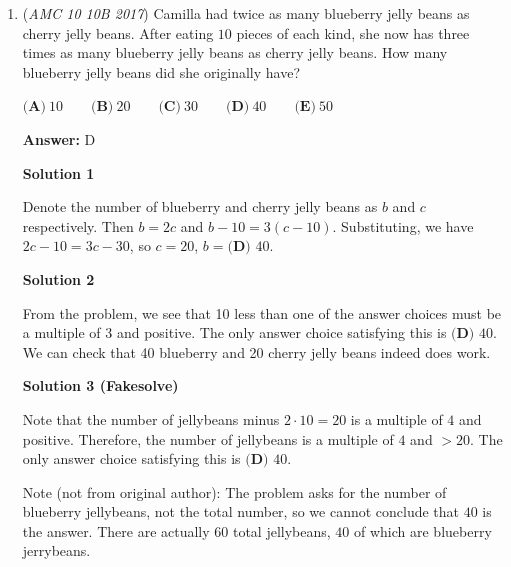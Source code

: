 \begin{enumerate}
\textbf{Solution 2}

Substituting each $x$ and $y$ with $1$, we see that the given equation holds true, as $\frac{3(1)+1}{1-3(1)} = -2$. Thus, $\frac{x+3y}{3x-y}=\boxed{\textbf{(D)}\ 2}$




\textbf{Solution 3}

Let $y=ax$. The first equation converts into $\frac{(3+a)x}{(1-3a)x}=-2$, which simplifies to $3+a=-2(1-3a)$. After a bit of algebra we found out $a=1$, which means that $x=y$. Substituting $y=x$ into the second equation it becomes $\frac{4x}{2x}=\boxed{\textbf{(D)}\ 2}$ - mathleticguyyy

 


	\item (\textit{AMC 10 10B 2017}) Camilla had twice as many blueberry jelly beans as cherry jelly beans. After eating $10$ pieces of each kind, she now has three times as many blueberry jelly beans as cherry jelly beans. How many blueberry jelly beans did she originally have?


 $\textbf{(A)}\ 10\qquad\textbf{(B)}\ 20\qquad\textbf{(C)}\ 30\qquad\textbf{(D)}\ 40\qquad\textbf{(E)}\ 50$

 \textbf{Answer: }D



\textbf{Solution 1}

Denote the number of blueberry and cherry jelly beans as $b$ and $c$ respectively. Then $b = 2c$ and $b-10 = 3(c-10)$. Substituting, we have $2c-10 = 3c-30$, so $c=20$, $b=\boxed{\textbf{(D) } 40}$.

 



\textbf{Solution 2}

From the problem, we see that 10 less than one of the answer choices must be a multiple of 3 and positive. The only answer choice satisfying this is $\boxed{\textbf{(D) } 40}$. We can check that 40 blueberry and 20 cherry jelly beans indeed does work.

 



\textbf{Solution 3 (Fakesolve)}

Note that the number of jellybeans minus $2 \cdot 10 = 20$ is a multiple of $4$ and positive. Therefore, the number of jellybeans is a multiple of $4$ and $>20$. The only answer choice satisfying this is $\boxed{\textbf{(D) } 40}$.

 Note (not from original author): The problem asks for the number of blueberry jellybeans, not the total number, so we cannot conclude that $40$ is the answer. There are actually $60$ total jellybeans, $40$ of which are blueberry jerrybeans.


\end{enumerate}
